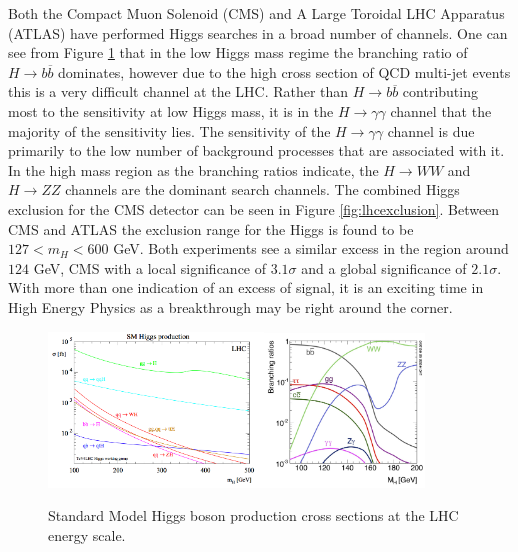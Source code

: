 Both the Compact Muon Solenoid (CMS) and A Large Toroidal LHC Apparatus (ATLAS) have performed Higgs searches in a broad number of channels.
One can see from Figure \ref{fig:higgsproduction} that in the low Higgs mass regime the branching ratio of $H\rightarrow b\overline{b}$ dominates, however due to the high cross section of QCD multi-jet events this is a very difficult channel at the LHC.
Rather than $H \rightarrow b\overline{b}$ contributing most to the sensitivity at low Higgs mass, it is in the $H\rightarrow\gamma\gamma$ channel that the majority of the sensitivity lies.
The sensitivity of the $H\rightarrow\gamma\gamma$ channel is due primarily to the low number of background processes that are associated with it.
In the high mass region as the branching ratios indicate, the $H\rightarrow WW$ and $H\rightarrow ZZ$ channels are the dominant search channels.
The combined Higgs exclusion for the CMS detector can be seen in Figure \ref{fig:lhcexclusion}.
Between CMS and ATLAS the exclusion range for the Higgs is found to be $127 < m_{H} < 600$ GeV.
Both experiments see a similar excess in the region around $124$ GeV, CMS with a local significance of $3.1\sigma$ and a global significance of $2.1\sigma$.
With more than one indication of an excess of signal, it is an exciting time in High Energy Physics as a breakthrough may be right around the corner.
\begin{figure}[htpb]
\begin{center}
\centerline{\includegraphics[width=0.51\textwidth]{plots/lhchiggsproduction.png}\includegraphics[width=0.38\textwidth]{plots/higgsbr.jpg}}
\caption{Standard Model Higgs boson production cross sections at the LHC energy scale\cite{HIGGS_PRODUCTION}.}
\label{fig:higgsproduction}
\end{center}
\end{figure}


